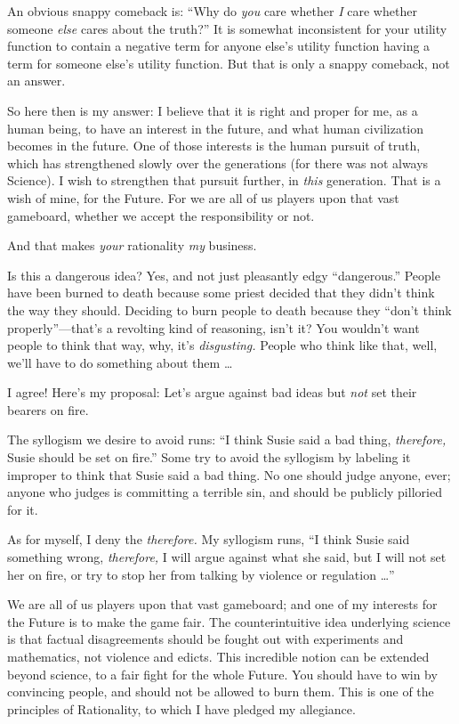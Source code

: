 {
 An obvious snappy comeback is: ``Why do
\textit{you} care whether \textit{I} care whether someone \textit{else}
cares about the truth?'' It is somewhat inconsistent
for your utility function to contain a negative term for anyone
else's utility function having a term for someone
else's utility function. But that is only a snappy
comeback, not an answer.}

{
 So here then is my answer: I believe that it is right and proper
for me, as a human being, to have an interest in the future, and what
human civilization becomes in the future. One of those interests is the
human pursuit of truth, which has strengthened slowly over the
generations (for there was not always Science). I wish to strengthen
that pursuit further, in \textit{this} generation. That is a wish of
mine, for the Future. For we are all of us players upon that vast
gameboard, whether we accept the responsibility or not.}

{
 And that makes \textit{your} rationality \textit{my} business.}

{
 Is this a dangerous idea? Yes, and not just pleasantly edgy
``dangerous.'' People have been
burned to death because some priest decided that they
didn't think the way they should. Deciding to burn
people to death because they ``don't
think properly''---that's a revolting
kind of reasoning, isn't it? You
wouldn't want people to think that way, why,
it's \textit{disgusting.} People who think like that,
well, we'll have to do something about them \ldots}

{
 I agree! Here's my proposal: Let's
argue against bad ideas but \textit{not} set their bearers on fire.}

{
 The syllogism we desire to avoid runs: ``I think
Susie said a bad thing, \textit{therefore,} Susie should be set on
fire.'' Some try to avoid the syllogism by labeling
it improper to think that Susie said a bad thing. No one should judge
anyone, ever; anyone who judges is committing a terrible sin, and
should be publicly pilloried for it.}

{
 As for myself, I deny the \textit{therefore.} My syllogism runs,
``I think Susie said something wrong,
\textit{therefore,} I will argue against what she said, but I will not
set her on fire, or try to stop her from talking by violence or
regulation \ldots''}

{
 We are all of us players upon that vast gameboard; and one of my
interests for the Future is to make the game fair. The counterintuitive
idea underlying science is that factual disagreements should be fought
out with experiments and mathematics, not violence and edicts. This
incredible notion can be extended beyond science, to a fair fight for
the whole Future. You should have to win by convincing people, and
should not be allowed to burn them. This is one of the principles of
Rationality, to which I have pledged my allegiance.}


